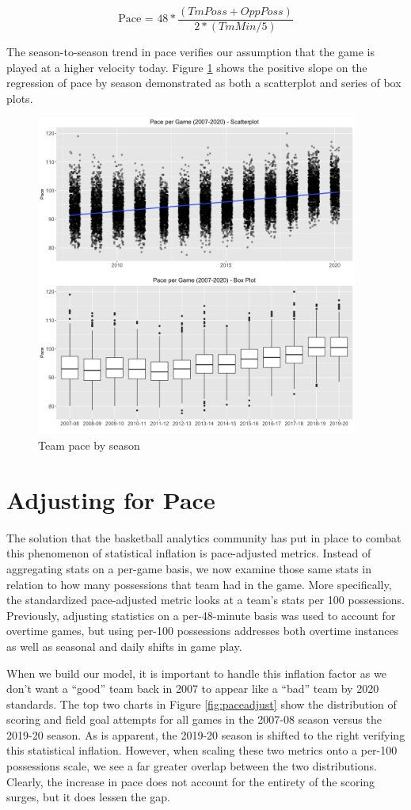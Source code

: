 \documentclass [MS] {uclathes}
\begin{document}
\noindent $$ \text{Pace = }  48 * \frac{(TmPoss + OppPoss)}{2 * (TmMin / 5)}  $$ 

The season-to-season trend in pace verifies our assumption that the game is played at a higher velocity today. Figure \ref{fig:pace} shows the positive slope on the regression of pace by season demonstrated as both a scatterplot and series of box plots. \\

\begin{figure}[h]
\centering
  \includegraphics[width=400px]{pace_byseason.png}
  \caption{Team pace by season}
  \label{fig:pace}
\end{figure}


\section{Adjusting for Pace}

The solution that the basketball analytics community has put in place to combat this phenomenon of statistical inflation is pace-adjusted metrics. Instead of aggregating stats on a per-game basis, we now examine those same stats in relation to how many possessions that team had in the game. More specifically, the standardized pace-adjusted metric looks at a team's stats per 100 possessions. Previously, adjusting statistics on a per-48-minute basis was used to account for overtime games, but using per-100 possessions addresses both overtime instances as well as seasonal and daily shifts in game play. 

When we build our model, it is important to handle this inflation factor as we don't want a ``good'' team back in 2007 to appear like a ``bad'' team by 2020 standards. The top two charts in Figure \ref{fig:paceadjust} show the distribution of scoring and field goal attempts for all games in the 2007-08 season versus the 2019-20 season. As is apparent, the 2019-20 season is shifted to the right verifying this statistical inflation. However, when scaling these two metrics onto a per-100 possessions scale, we see a far greater overlap between the two distributions. Clearly, the increase in pace does not account for the entirety of the scoring surges, but it does lessen the gap. 
\end{document}

